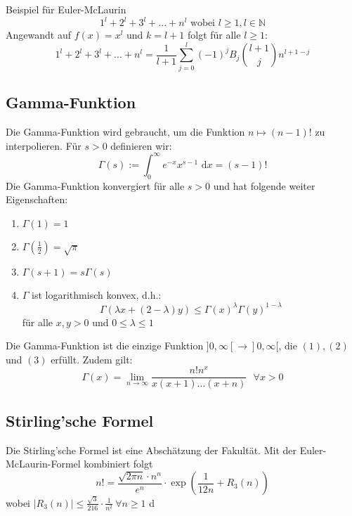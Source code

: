 \documentclass[a4paper,10pt]{article}
\def\limn{\lim_{n\to \infty}}
\def\dx{\text{ d}x}
\begin{document}
\begin{subbox}{Beispiel für Euler-McLaurin}
  $$1^l + 2^l + 3^l + ... + n^l \text{ wobei } l \geq 1, l \in \mathbb{N}$$
  Angewandt auf $f(x) = x^l$ und $k = l + 1$ folgt für alle $l \geq 1$:
  $$1^l + 2^l + 3^l + ... + n^l = \frac{1}{l + 1} \sum_{j = 0}^l (-1)^j B_j {l + 1 \choose j} n^{l+1-j}$$
\end{subbox}

\subsection{Gamma-Funktion}
Die Gamma-Funktion wird gebraucht, um die Funktion $n \mapsto (n-1)!$ zu interpolieren. Für $s > 0$ definieren wir: $$\Gamma(s) := \int_0^\infty e^{-x}x^{s-1}\dx = (s-1)!$$
Die Gamma-Funktion konvergiert für alle $s > 0$ und hat folgende weiter Eigenschaften:
\begin{enumerate}
  \item $\Gamma(1) = 1$
  \item $\Gamma(\frac{1}{2}) = \sqrt{\pi}$
  \item $\Gamma(s + 1) = s \Gamma(s)$
  \item $\Gamma$ ist logarithmisch konvex, d.h.: $$\Gamma(\lambda x + (2 - \lambda)y) \leq \Gamma(x)^\lambda \Gamma(y)^{1 - \lambda}$$ für alle $x, y > 0$ und $0 \leq \lambda \leq 1$
\end{enumerate}
Die Gamma-Funktion ist die einzige Funktion $]0, \infty[ \to ]0, \infty[$, die $(1), (2)$ und $(3)$ erfüllt. Zudem gilt: $$\Gamma(x) = \limn \frac{n!n^x}{x(x+1)...(x+n)} \ \ \ \forall x > 0$$

\subsection{Stirling'sche Formel}
Die Stirling'sche Formel ist eine Abschätzung der Fakultät. Mit der Euler-McLaurin-Formel kombiniert folgt
$$n! = \frac{\sqrt{2\pi n} \cdot n^n}{e^n} \cdot \exp(\frac{1}{12n}+R_3(n))$$
wobei $|R_3(n)| \le \frac{\sqrt{3}}{216}\cdot\frac{1}{n^2} \ \forall n \ge 1$
d
\end{document}
